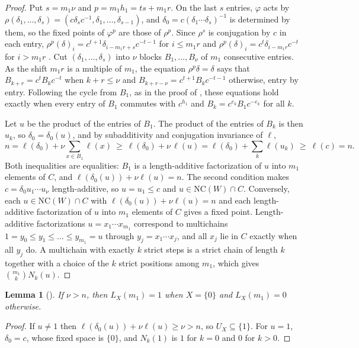 \documentclass[11pt]{article}
\newtheorem{lemma}[theorem]{Lemma}
\theoremstyle{definition}
\newcommand{\NC}{\mathrm{NC}}
\begin{document}
\begin{proof}
Put $s=m_1\nu$ and $p=m_1h_1=ts+m_1r$. On the last $s$ entries,
$\varphi$ acts by $\rho(\delta_1,\dots,\delta_s)=(c\delta_sc^{-1},\delta_1,
\dots,\delta_{s-1})$, and $\delta_0=c(\delta_1\cdots\delta_s)^{-1}$ is
determined by them, so the fixed points of $\varphi^p$ are those of
$\rho^p$. Since $\rho^s$ is conjugation by $c$ in each entry,
$\rho^p(\delta)_i=c^{t+1}\delta_{i-m_1r+s}c^{-t-1}$ for $i\le m_1r$ and
$\rho^p(\delta)_i=c^t\delta_{i-m_1r}c^{-t}$ for $i>m_1r$
\cite[(5.1), (5.8)]{KM}. Cut $(\delta_1,\dots,\delta_s)$ into $\nu$ blocks
$B_1,\dots,B_{\nu}$ of $m_1$ consecutive entries. As the shift $m_1r$ is a
multiple of $m_1$, the equation $\rho^p\delta=\delta$ says that
$B_{k+r}=c^tB_kc^{-t}$ when $k+r\le \nu$ and $B_{k+r-\nu}=c^{t+1}B_kc^{-t-1}$
otherwise, entry by entry. Following the cycle from $B_1$, as in the proof
of \cite[Lemma~30]{KM}, these equations hold exactly when every entry of $B_1$ commutes with $c^{h_1}$ and
$B_k=c^{e_k}B_1c^{-e_k}$ for all $k$.

Let $u$ be the product of the entries of $B_1$. The product of the entries
of $B_k$ is then $u_k$, so $\delta_0=\delta_0(u)$, and by subadditivity and
conjugation invariance of $\ell$,
\[
n=\ell(\delta_0)+\nu\sum_{x\in B_1}\ell(x)\ \ge\ \ell(\delta_0)+\nu\,\ell(u)
=\ell(\delta_0)+\sum_k\ell(u_k)\ \ge\ \ell(c)=n.
\]
Both inequalities are equalities: $B_1$ is a length-additive factorization
of $u$ into $m_1$ elements of $C$, and
$\ell(\delta_0(u))+\nu\ell(u)=n$. The second condition makes
$c=\delta_0u_1\cdots u_{\nu}$ length-additive, so $u=u_1\le c$ and $u\in
\NC(W)\cap C$. Conversely, each $u\in\NC(W)\cap C$ with
$\ell(\delta_0(u))+\nu\ell(u)=n$ and each length-additive factorization of
$u$ into $m_1$ elements of $C$ gives a fixed point. Length-additive
factorizations $u=x_1\cdots x_{m_1}$ correspond to multichains
$1=y_0\le y_1\le\dots\le y_{m_1}=u$ through $y_j=x_1\cdots x_j$, and all
$x_j$ lie in $C$ exactly when all $y_j$ do. A multichain with exactly $k$
strict steps is a strict chain of length $k$ together with a choice of the
$k$ strict positions among $m_1$, which gives $\binom{m_1}{k}N_k(u)$.
\end{proof}

\begin{lemma}[{\cite[Lemma~31]{KM}}]\label{lem:large}
If $\nu>n$, then $L_X(m_1)=1$ when $X=\{0\}$ and $L_X(m_1)=0$ otherwise.
\end{lemma}

\begin{proof}
If $u\ne1$ then $\ell(\delta_0(u))+\nu\ell(u)\ge \nu>n$, so $U_X\subseteq\{1\}$.
For $u=1$, $\delta_0=c$, whose fixed space is $\{0\}$, and $N_k(1)$ is $1$
for $k=0$ and $0$ for $k>0$.
\end{proof}
\end{document}
